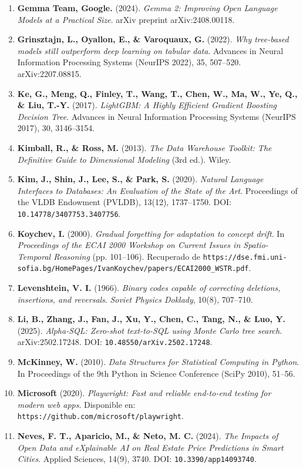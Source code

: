 \documentclass[a4paper,11pt,openany]{book}
\begin{document}
\begin{enumerate}
    \item \textbf{Gemma Team, Google.} (2024). \textit{Gemma 2: Improving Open Language Models at a Practical Size}. arXiv preprint arXiv:2408.00118.
    \item \textbf{Grinsztajn, L., Oyallon, E., \& Varoquaux, G.} (2022). \textit{Why tree-based models still outperform deep learning on tabular data}. Advances in Neural Information Processing Systems (NeurIPS 2022), 35, 507--520. arXiv:2207.08815.
    \item \textbf{Ke, G., Meng, Q., Finley, T., Wang, T., Chen, W., Ma, W., Ye, Q., \& Liu, T.-Y.} (2017). \textit{LightGBM: A Highly Efficient Gradient Boosting Decision Tree}. Advances in Neural Information Processing Systems (NeurIPS 2017), 30, 3146--3154.
    \item \textbf{Kimball, R., \& Ross, M.} (2013). \textit{The Data Warehouse Toolkit: The Definitive Guide to Dimensional Modeling} (3rd ed.). Wiley.
    \item \textbf{Kim, J., Shin, J., Lee, S., \& Park, S.} (2020). \textit{Natural Language Interfaces to Databases: An Evaluation of the State of the Art}. Proceedings of the VLDB Endowment (PVLDB), 13(12), 1737--1750. DOI: \nolinkurl{10.14778/3407753.3407756}.
    \item \textbf{Koychev, I.} (2000). \textit{Gradual forgetting for adaptation to concept drift}. In \textit{Proceedings of the ECAI 2000 Workshop on Current Issues in Spatio-Temporal Reasoning} (pp. 101--106). Recuperado de \nolinkurl{https://dse.fmi.uni-sofia.bg/HomePages/IvanKoychev/papers/ECAI2000_WSTR.pdf}.
    \item \textbf{Levenshtein, V. I.} (1966). \textit{Binary codes capable of correcting deletions, insertions, and reversals}. \textit{Soviet Physics Doklady}, 10(8), 707--710.
    \item \textbf{Li, B., Zhang, J., Fan, J., Xu, Y., Chen, C., Tang, N., \& Luo, Y.} (2025). \textit{Alpha-SQL: Zero-shot text-to-SQL using Monte Carlo tree search}. arXiv:2502.17248. DOI: \nolinkurl{10.48550/arXiv.2502.17248}.
    \item \textbf{McKinney, W.} (2010). \textit{Data Structures for Statistical Computing in Python}. In Proceedings of the 9th Python in Science Conference (SciPy 2010), 51--56.
    \item \textbf{Microsoft} (2020). \textit{Playwright: Fast and reliable end-to-end testing for modern web apps}. Disponible en: \nolinkurl{https://github.com/microsoft/playwright}.
    \item \textbf{Neves, F. T., Aparicio, M., \& Neto, M. C.} (2024). \textit{The Impacts of Open Data and eXplainable AI on Real Estate Price Predictions in Smart Cities}. Applied Sciences, 14(9), 3740. DOI: \nolinkurl{10.3390/app14093740}.

\end{enumerate}
\end{document}
